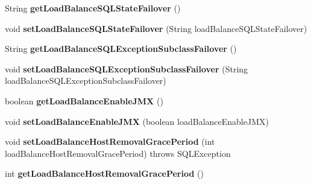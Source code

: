 \begin{DoxyCompactItemize}
String {\bfseries get\+Load\+Balance\+S\+Q\+L\+State\+Failover} ()
\item 
\mbox{\label{classcom_1_1mysql_1_1jdbc_1_1_connection_properties_impl_ab21b344d91d3aad438e3e411d520815e}} 
void {\bfseries set\+Load\+Balance\+S\+Q\+L\+State\+Failover} (String load\+Balance\+S\+Q\+L\+State\+Failover)
\item 
\mbox{\label{classcom_1_1mysql_1_1jdbc_1_1_connection_properties_impl_a09648d404ee44df0495dc0db1d77a07b}} 
String {\bfseries get\+Load\+Balance\+S\+Q\+L\+Exception\+Subclass\+Failover} ()
\item 
\mbox{\label{classcom_1_1mysql_1_1jdbc_1_1_connection_properties_impl_a72de44e6a418e907b160b13b2c6996ae}} 
void {\bfseries set\+Load\+Balance\+S\+Q\+L\+Exception\+Subclass\+Failover} (String load\+Balance\+S\+Q\+L\+Exception\+Subclass\+Failover)
\item 
\mbox{\label{classcom_1_1mysql_1_1jdbc_1_1_connection_properties_impl_a2028b4a62aa0f166d176804154e34696}} 
boolean {\bfseries get\+Load\+Balance\+Enable\+J\+MX} ()
\item 
\mbox{\label{classcom_1_1mysql_1_1jdbc_1_1_connection_properties_impl_aa5dcb20b112ebe9e74cc37cdfc338767}} 
void {\bfseries set\+Load\+Balance\+Enable\+J\+MX} (boolean load\+Balance\+Enable\+J\+MX)
\item 
\mbox{\label{classcom_1_1mysql_1_1jdbc_1_1_connection_properties_impl_a71dce4587992d8466e06a6901a38bc38}} 
void {\bfseries set\+Load\+Balance\+Host\+Removal\+Grace\+Period} (int load\+Balance\+Host\+Removal\+Grace\+Period)  throws S\+Q\+L\+Exception 
\item 
\mbox{\label{classcom_1_1mysql_1_1jdbc_1_1_connection_properties_impl_a9fe34bceb81dc8f42b476277f8bb46da}} 
int {\bfseries get\+Load\+Balance\+Host\+Removal\+Grace\+Period} ()
\item 

\end{DoxyCompactItemize}
